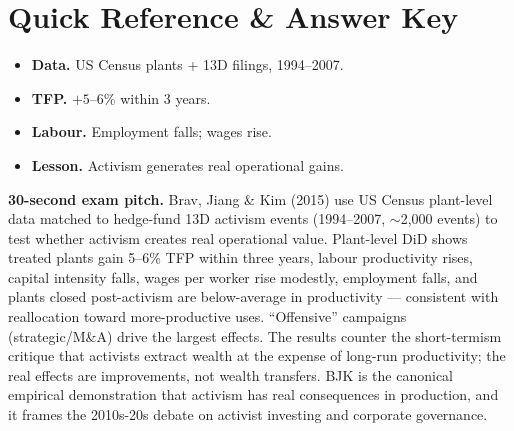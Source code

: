 \documentclass[11pt]{article}
\begin{document}
\section*{Quick Reference \& Answer Key}
\begin{answerbox}
\begin{itemize}
\item \textbf{Data.} US Census plants + 13D filings, 1994--2007.
\item \textbf{TFP.} $+5$--$6$\% within 3 years.
\item \textbf{Labour.} Employment falls; wages rise.
\item \textbf{Lesson.} Activism generates real operational gains.
\end{itemize}
\end{answerbox}

\begin{keybox}
\textbf{30-second exam pitch.} Brav, Jiang \& Kim (2015) use US Census plant-level data matched to hedge-fund 13D activism events (1994--2007, $\sim$2{,}000 events) to test whether activism creates real operational value. Plant-level DiD shows treated plants gain 5--6\% TFP within three years, labour productivity rises, capital intensity falls, wages per worker rise modestly, employment falls, and plants closed post-activism are below-average in productivity --- consistent with reallocation toward more-productive uses. ``Offensive'' campaigns (strategic/M\&A) drive the largest effects. The results counter the short-termism critique that activists extract wealth at the expense of long-run productivity; the real effects are improvements, not wealth transfers. BJK is the canonical empirical demonstration that activism has real consequences in production, and it frames the 2010s-20s debate on activist investing and corporate governance.
\end{keybox}
\end{document}
